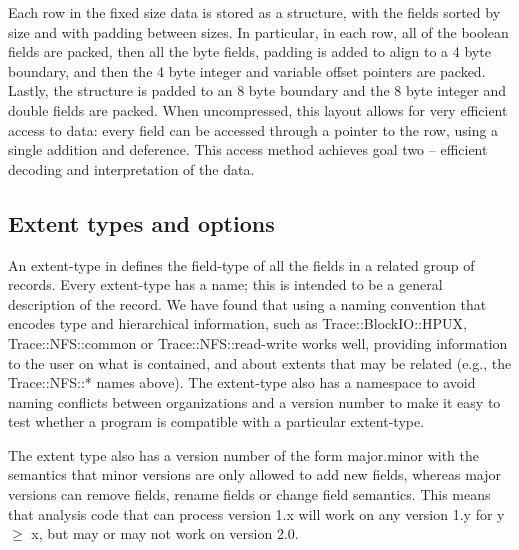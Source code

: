 Each row in the fixed size data is stored as a structure, with the fields sorted by size and with 
padding between sizes.
In particular, in each row, all of the boolean fields are packed, then all
the byte fields, padding is added to align to a 4 byte boundary, and
then the 4 byte integer and variable offset pointers are packed.
Lastly, the structure is padded to an 8 byte boundary and the 8 byte
integer and double fields are packed. When uncompressed, this layout
allows for very efficient access to data: every field can be accessed
through a pointer to the row, using a single addition and deference. 
This access method achieves goal two -- efficient decoding and
interpretation of the data.

\subsection{Extent types and options}\label{sec:extenttype}

An extent-type in \DataSeries{} defines the field-type of all the fields in a
related group of records.  Every extent-type has a name; this is
intended to be a general description of the record.  We have found that
using a naming convention that encodes type and hierarchical information,
such as 
Trace::BlockIO::HPUX, 
Trace::NFS::common or
Trace::NFS::read-write
works well, providing information to the user on what is contained, and 
about extents that may be related (e.g., the Trace::NFS::* names above). 
The extent-type also has a namespace to avoid naming conflicts between
organizations and a version number to make it easy to test whether
a program is compatible with a particular extent-type.


The extent type also has a version number of the form major.minor with the
semantics that minor versions are only allowed to add new fields,
whereas major versions can remove fields, rename fields or change
field semantics.  This means that analysis code that can process
version 1.x will work on any version 1.y for y $\geq$ x, but may or may not
work on version 2.0.

